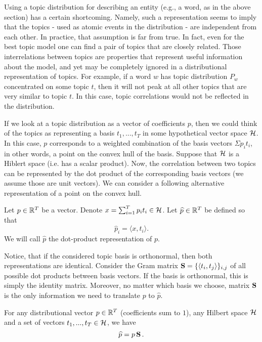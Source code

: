 Using a topic distribution for describing an entity (e.g., a word, as in
the above section) has a certain
shortcoming. Namely, such a representation seems to imply that the
topics - used as atomic events in the distribution - are independent
from each other. In practice, that assumption is far from true. In
fact, even for the best topic model one can find a pair of topics that
are closely related. Those interrelations between topics are
properties that represent useful information about the model, and yet
may be completely ignored in a distributional representation of
topics. For example, if a word $w$ has topic distribution $P_w$
concentrated on some topic $t$, then it will 
not peak at all other topics that are very similar to
topic $t$. In this case, topic correlations would not be reflected in
the distribution. 

If we look at a topic distribution as a vector of coefficients $p$, then
we could think of the topics as representing a basis $t_1,...,t_T$ in
some hypothetical vector space ${\mathcal H}$. In 
this case, $p$ corresponds to a weighted combination of the basis
vectors $\Sigma p_i t_i$, in other words, a point on the convex hull of the basis.
Suppose that ${\mathcal H}$ is a Hiblert space (i.e. has a scalar
product). Now, the correlation between two topics can be represented
by the dot product of the corresponding basis vectors (we assume those
are unit vectors). We can consider a following alternative representation
of a point on the convex hull.

\bed
Let $p\in{\mathbb R}^T$ be a vector. Denote $x=\sum_{i=1}^T p_i
t_i\in{\mathcal H}$. Let $\widehat{p}\in{\mathbb R}^T$ be defined so that
\[\widehat{p}_i = \langle x,t_i\rangle.\]
We will call $\widehat{p}$ the dot-product representation of $p$.
\eed

Notice, that if the considered topic basis is orthonormal, then both
representations are identical. Consider the Gram matrix
$\operatorname{\mathbf{S}}=\{\langle t_i,t_j\rangle\}_{i,j}$ of all possible dot products between
basis vectors. If the basis is orthonormal, this is simply the identity
matrix. Moreover, no matter which basis we choose, matrix $\operatorname{\mathbf{S}}$ is the
only information we need to translate $p$ to $\widehat{p}$.

\ber
For any distributional vector $p\in{\mathbb R}^T$ (coefficients
sum to $1$), any Hilbert space ${\mathcal H}$ and a set of
vectors $t_1,...,t_T\in{\mathcal H}$, we have 
\[\widehat{p} = p\operatorname{\mathbf{S}}.\]
\eer

